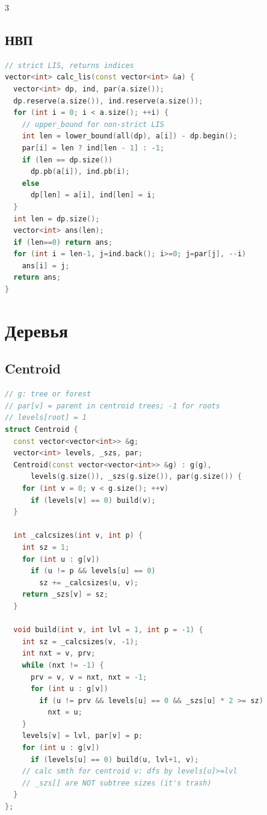 \documentclass[8pt,a4paper,landscape,twosided]{extarticle}
\begin{document}
\begin{multicols*}{3}
\subsection{НВП}
\begin{lstlisting}[language=C++]
// strict LIS, returns indices
vector<int> calc_lis(const vector<int> &a) {
  vector<int> dp, ind, par(a.size());
  dp.reserve(a.size()), ind.reserve(a.size());
  for (int i = 0; i < a.size(); ++i) {
    // upper_bound for non-strict LIS
    int len = lower_bound(all(dp), a[i]) - dp.begin();
    par[i] = len ? ind[len - 1] : -1;
    if (len == dp.size())
      dp.pb(a[i]), ind.pb(i);
    else
      dp[len] = a[i], ind[len] = i;
  }
  int len = dp.size();
  vector<int> ans(len);
  if (len==0) return ans;
  for (int i = len-1, j=ind.back(); i>=0; j=par[j], --i)
    ans[i] = j;
  return ans;
}
\end{lstlisting}

\section{Деревья}

\subsection{Centroid}
\begin{lstlisting}[language=C++]
// g: tree or forest
// par[v] = parent in centroid trees; -1 for roots
// levels[root] = 1
struct Centroid {
  const vector<vector<int>> &g;
  vector<int> levels, _szs, par;
  Centroid(const vector<vector<int>> &g) : g(g),
      levels(g.size()), _szs(g.size()), par(g.size()) {
    for (int v = 0; v < g.size(); ++v)
      if (levels[v] == 0) build(v);
  }

  int _calcsizes(int v, int p) {
    int sz = 1;
    for (int u : g[v])
      if (u != p && levels[u] == 0)
        sz += _calcsizes(u, v);
    return _szs[v] = sz;
  }

  void build(int v, int lvl = 1, int p = -1) {
    int sz = _calcsizes(v, -1);
    int nxt = v, prv;
    while (nxt != -1) {
      prv = v, v = nxt, nxt = -1;
      for (int u : g[v])
        if (u != prv && levels[u] == 0 && _szs[u] * 2 >= sz)
          nxt = u;
    }
    levels[v] = lvl, par[v] = p;
    for (int u : g[v])
      if (levels[u] == 0) build(u, lvl+1, v);
    // calc smth for centroid v: dfs by levels[u]>=lvl
    // _szs[] are NOT subtree sizes (it's trash)
  }
};
\end{lstlisting}


\end{multicols*}
\end{document}
